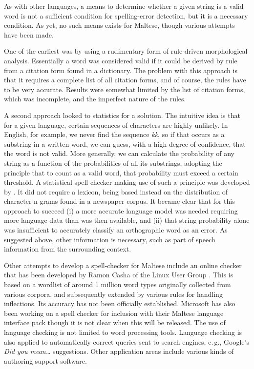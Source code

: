 \begin{multicols}{2}
As with other languages, a means to determine whether a given string is a valid word is not a sufficient condition for spelling-error detection, but it is a necessary condition. As yet, no such means exists for Maltese, though various attempts have been made. 

One of the earliest was by \cite{Mangion:1999} using a rudimentary form of rule-driven morphological analysis. Essentially a word was considered valid if it could be derived by rule from a citation form found in a dictionary. The problem with this approach is that it requires a complete list of all citation forms, and of course, the rules have to be very accurate. Results were somewhat limited by the list of citation forms, which was incomplete, and the imperfect nature of the rules.

A second approach looked to statistics for a solution. The intuitive idea is that for a given language, certain sequences of characters are highly unlikely. In English, for example, we never find the sequence \emph{kk}, so if that occurs as a substring in a written word, we can guess, with a high degree of confidence, that the word is not valid. More generally, we can calculate the probability of any string as a function of the probabilities of all its substrings, adopting the principle that to count as a valid word, that probability must exceed a certain threshold. A statistical spell checker making use of such a principle was developed by \cite{Mizzi:2000}. It did not require a lexicon, being based instead on the distribution of character n-grams found in a newspaper corpus. It became clear that for this approach to succeed (i) a more accurate language model was needed requiring more language data than was then available, and (ii) that string probability alone was insufficient to accurately classify an orthographic word as an error. As suggested above, other information is necessary, such as part of speech information from the surrounding context.

Other attempts to develop a spell-checker for Maltese include an online checker that has been developed by Ramon Casha of the Linux User Group \cite{Linux-spellcheck1}.  This is based on a wordlist of around 1 million word types originally collected from various corpora, and subsequently extended by various rules for handling inflections. Its accuracy has not been officially established. Microsoft has also been working on a spell checker for inclusion with their Maltese language interface pack though it is not clear when this will be released.
%
The use of language checking is not limited to word processing tools. Language checking is also applied to automatically correct queries sent to search engines, e.\,g., Google’s \emph{Did you mean…} suggestions. Other application areas include various kinds of authoring support software. 


\end{multicols}
